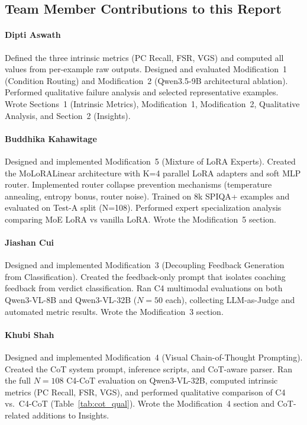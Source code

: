 \documentclass{article}
\begin{document}
\subsection{Team Member Contributions to this Report}

\paragraph{Dipti Aswath} Defined the three intrinsic metrics (PC Recall, FSR, VGS)
and computed all values from per-example raw outputs. Designed and evaluated
Modification~1 (Condition Routing) and Modification~2 (Qwen3.5-9B architectural ablation).
Performed qualitative failure analysis and selected representative examples.
Wrote Sections~1 (Intrinsic Metrics), Modification~1, Modification~2, Qualitative Analysis,
and Section~2 (Insights).

\paragraph{Buddhika Kahawitage} Designed and implemented Modification~5 (Mixture of LoRA Experts). Created the MoLoRALinear architecture with K=4 parallel LoRA adapters and soft MLP router. Implemented router collapse prevention mechanisms (temperature annealing, entropy bonus, router noise). Trained on 8k SPIQA+ examples and evaluated on Test-A split (N=108). Performed expert specialization analysis comparing MoE LoRA vs vanilla LoRA. Wrote the Modification~5 section.

\paragraph{Jiashan Cui} Designed and implemented Modification~3 (Decoupling Feedback Generation from Classification). Created the feedback-only prompt that isolates coaching feedback from verdict classification. Ran C4 multimodal evaluations on both Qwen3-VL-8B and Qwen3-VL-32B ($N{=}50$ each), collecting LLM-as-Judge and automated metric results. Wrote the Modification~3 section.

\paragraph{Khubi Shah} Designed and implemented Modification~4 (Visual
Chain-of-Thought Prompting). Created the CoT system prompt, inference scripts, and CoT-aware parser.
Ran the full $N{=}108$ C4-CoT evaluation on Qwen3-VL-32B, computed intrinsic metrics
(PC Recall, FSR, VGS), and performed qualitative comparison of C4 vs.\ C4-CoT
(Table~\ref{tab:cot_qual}). Wrote the Modification~4 section and CoT-related
additions to Insights.
\end{document}
